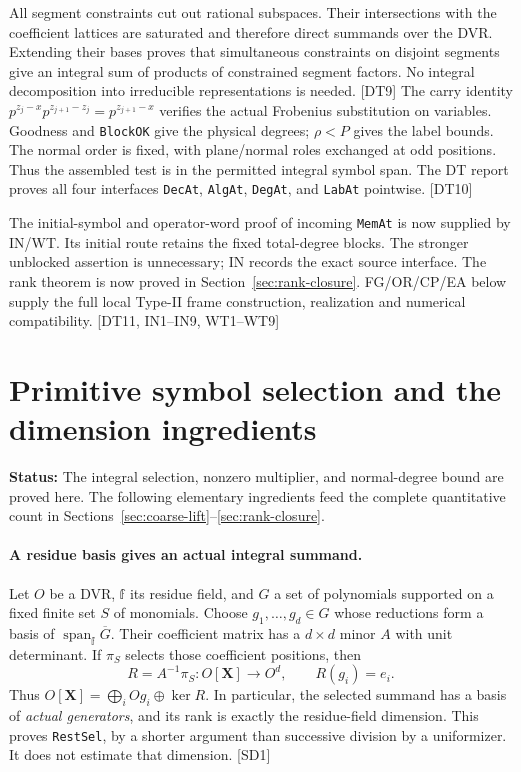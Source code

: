 \documentclass[11pt,a4paper]{article}
\numberwithin{equation}{section}
\theoremstyle{remark}\newtheorem{remark}[theorem]{Remark}
\newcommand{\status}[1]{\textbf{Status:} #1}
\begin{document}
All segment constraints cut out rational subspaces. Their intersections with the coefficient lattices are saturated and therefore direct summands over the DVR. Extending their bases proves that simultaneous constraints on disjoint segments give an integral sum of products of constrained segment factors. No integral decomposition into irreducible representations is needed. \textsf{[DT9]}
The carry identity $p^{z_j-x}p^{z_{j+1}-z_j}=p^{z_{j+1}-x}$ verifies the actual Frobenius substitution on variables. Goodness and \texttt{BlockOK} give the physical degrees; $\rho<P$ gives the label bounds. The normal order is fixed, with plane/normal roles exchanged at odd positions. Thus the assembled test is in the permitted integral symbol span. The DT report proves all four interfaces \texttt{DecAt}, \texttt{AlgAt}, \texttt{DegAt}, and \texttt{LabAt} pointwise. \textsf{[DT10]}

The initial-symbol and operator-word proof of incoming \texttt{MemAt} is now supplied by IN/WT. Its initial route retains the fixed total-degree blocks. The stronger unblocked assertion is unnecessary; IN records the exact source interface. The rank theorem is now proved in Section~\ref{sec:rank-closure}. FG/OR/CP/EA below supply the full local Type-II frame construction, realization and numerical compatibility. \textsf{[DT11, IN1--IN9, WT1--WT9]}

\section{Primitive symbol selection and the dimension ingredients}\label{sec:selected-dimension}

\status{The integral selection, nonzero multiplier, and normal-degree bound are proved here. The following elementary ingredients feed the complete quantitative count in Sections~\ref{sec:coarse-lift}--\ref{sec:rank-closure}.}

\paragraph{A residue basis gives an actual integral summand.}
Let $O$ be a DVR, $\mathbb f$ its residue field, and $G$ a set of polynomials supported on a fixed finite set $S$ of monomials. Choose $g_1,\ldots,g_d\in G$ whose reductions form a basis of $\operatorname{span}_{\mathbb f}\overline G$. Their coefficient matrix has a $d\times d$ minor $A$ with unit determinant. If $\pi_S$ selects those coefficient positions, then
\[
 R=A^{-1}\pi_S:O[\mathbf X]\longrightarrow O^d,
 \qquad R(g_i)=e_i.
\]
Thus $O[\mathbf X]=\bigoplus_i Og_i\oplus\ker R$. In particular, the selected summand has a basis of \emph{actual generators}, and its rank is exactly the residue-field dimension. This proves \texttt{RestSel}, by a shorter argument than successive division by a uniformizer. It does not estimate that dimension. \textsf{[SD1]}\cite{symbol-selection}
\end{document}
